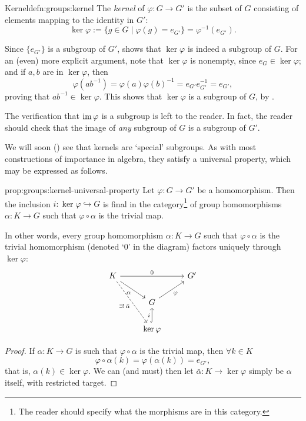 \begin{defn}{Kernel}{defn:groups:kernel}
  The \emph{kernel} of $\varphi : G \to G'$ is the subset of $G$
  consisting of elements mapping to the identity in $G'$:
  \[
    \ker\varphi := \{g \in G \mid \varphi(g) = e_{G'}\} =
    \varphi^{-1}(e_{G'}).
  \]
\end{defn}

Since $\{e_{G'}\}$ is a subgroup of $G'$,
 shows that $\ker\varphi$
is indeed a subgroup of $G$. For an (even) more explicit argument,
note that $\ker\varphi$ is nonempty, since $e_G \in \ker\varphi$; and
if $a, b$ are in $\ker\varphi$, then
\[
  \varphi(ab^{-1}) = \varphi(a)\varphi(b)^{-1} = e_{G'}e_{G'}^{-1} =
  e_{G'},
\]
proving that $ab^{-1} \in \ker\varphi$. This shows that $\ker\varphi$
is a subgroup of $G$, by
.

The verification that $\operatorname{im}\varphi$ is a subgroup is left to the
reader. In fact, the reader should check that the image of \emph{any}
subgroup of $G$ is a subgroup of $G'$.

We will soon () see that
kernels are `special' subgroups. As with most constructions of
importance in algebra, they satisfy a universal property, which may be
expressed as follows.

\begin{prop}{}{prop:groups:kernel-universal-property}
  Let $\varphi : G \to G'$ be a homomorphism. Then the
inclusion $i : \ker\varphi \hookrightarrow G$ is final in the
category\footnote{The reader should specify what the morphisms are in
this category.} of group homomorphisms $\alpha : K \to G$ such that
$\varphi \circ \alpha$ is the trivial
map.

In other words, every group homomorphism $\alpha : K \to G$ such that
$\varphi \circ \alpha$ is the trivial homomorphism (denoted `$0$' in
the diagram) factors uniquely through $\ker\varphi$:
\[
  \begin{tikzcd}
    K \arrow[rr, "0"] \arrow[dr, "\alpha"'] \arrow[ddr, dashed, "\exists!\,\bar\alpha"'] & & G' \\
    & G \arrow[ur, "\varphi"'] & \\
    & \ker\varphi \arrow[u, hook, "i"] &
  \end{tikzcd}
\]
\end{prop}
\begin{proof}
  If $\alpha : K \to G$ is such that $\varphi \circ \alpha$ is the
  trivial map, then $\forall k \in K$
  \[
    \varphi \circ \alpha(k) = \varphi(\alpha(k)) = e_{G'},
  \]
  that is, $\alpha(k) \in \ker\varphi$. We can (and must) then let
  $\bar\alpha : K \to \ker\varphi$ simply be $\alpha$ itself, with
  restricted target.
\end{proof}

